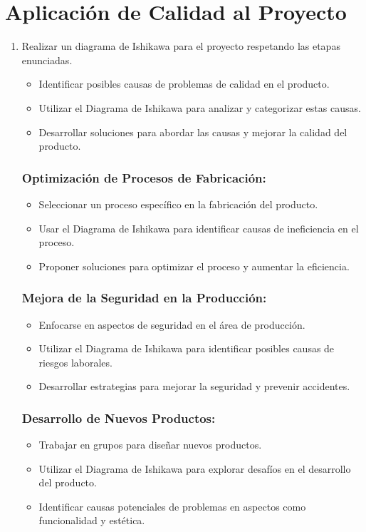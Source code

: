 \documentclass[../main]{subfiles}
\begin{document}
\chapter{Aplicación de Calidad al Proyecto}
\begin{enumerate}
  \item  Realizar un diagrama de Ishikawa para el proyecto respetando
    las etapas enunciadas.

    \begin{itemize}
      \item Identificar posibles causas de problemas de calidad en el producto.
      \item Utilizar el Diagrama de Ishikawa para analizar y
        categorizar estas causas.
      \item Desarrollar soluciones para abordar las causas y mejorar la
        calidad del producto.
    \end{itemize}

    \subsection*{Optimización de Procesos de Fabricación:}
    \begin{itemize}
      \item Seleccionar un proceso específico en la fabricación del producto.
      \item Usar el Diagrama de Ishikawa para identificar causas de
        ineficiencia en el proceso.
      \item Proponer soluciones para optimizar el proceso y aumentar la
        eficiencia.
    \end{itemize}

    \subsection*{Mejora de la Seguridad en la Producción:}
    \begin{itemize}
      \item Enfocarse en aspectos de seguridad en el área de producción.
      \item Utilizar el Diagrama de Ishikawa para identificar
        posibles causas de riesgos laborales.
      \item Desarrollar estrategias para mejorar la seguridad y
        prevenir accidentes.
    \end{itemize}

    \subsection*{Desarrollo de Nuevos Productos:}
    \begin{itemize}
      \item Trabajar en grupos para diseñar nuevos productos.
      \item Utilizar el Diagrama de Ishikawa para explorar desafíos
        en el desarrollo del producto.
      \item Identificar causas potenciales de problemas en aspectos
        como funcionalidad y estética.
    \end{itemize}

\end{enumerate}
\end{document}
